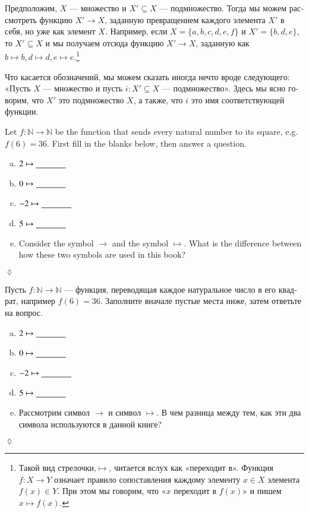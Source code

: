 \documentclass[a4paper]{book}
\def\NN{{\mathbb N}}
\def\to{\rightarrow}
\def\taking{\colon}
\def\ss{\subseteq}
\def\ul{\underline}
\theoremstyle{myth}
\newtheorem{excENG}[envENG]{\begin{english}Exercise\end{english}}
\newenvironment{exerciseENG}{\begin{excENG}}{\hspace*{\fill}$\lozenge$\end{excENG}}
\newtheorem{exampleRUS}[envRUS]{\begin{russian}Пример\end{russian}}
\newtheorem{excRUS}[envRUS]{\begin{russian}Упражнение\end{russian}}
\newenvironment{exerciseRUS}{\begin{excRUS}}{\hspace*{\fill}$\lozenge$\end{excRUS}}
\def\sexc{\begin{enumerate}[a.)]\setlength{\itemsep}{.1cm}\setlength{\parskip}{.1cm}\item}
\def\next{\item}
\def\endsexc{\end{enumerate}}
\begin{document}
\begin{english}
\begin{exampleRUS}\label{ex:subset as function}
\begin{russian}
Предположим, $X$ — множество и $X'\ss X$ — подмножество. Тогда мы можем рассмотреть функцию $X'\to X$, заданную превращением каждого элемента $X'$ в себя, но уже как элемент $X$. Например, если $X=\{a,b,c,d,e,f\}$ и $X'=\{b,d,e\}$, то $X'\ss X$ и мы получаем отсюда функцию $X'\to X$, заданную как $b\mapsto b, d\mapsto d, e\mapsto e$.\footnote{Такой вид стрелочки,\;\;$\mapsto$\;\;, читается вслух как «переходит в». Функция $f\taking X\to Y$ означает правило сопоставления каждому элементу $x\in X$ элемента $f(x)\in Y$. При этом мы говорим, что «$x$ переходит в $f(x)$» и пишем $x\mapsto f(x)$.}

Что касается обозначений, мы можем сказать иногда нечто вроде следующего: «Пусть $X$ — множество и пусть $i\taking X'\ss X$ — подмножество». Здесь мы ясно говорим, что $X'$ это подмножество $X$, а также, что $i$ это имя соответствующей функции. 
\end{russian}
\end{exampleRUS}

\begin{exerciseENG}
Let $f\taking\NN\to\NN$ be the function that sends every natural number to its square, e.g. $f(6)=36$. First fill in the blanks below, then answer a question.
\sexc $2\mapsto\ul{\hspace{.5in}}$
\next $0\mapsto\ul{\hspace{.5in}}$
\next $-2\mapsto\ul{\hspace{.5in}}$
\next $5\mapsto\ul{\hspace{.5in}}$
\next Consider the symbol $\to$ and the symbol $\mapsto$. What is the difference between how these two symbols are used in this book?
\endsexc
\end{exerciseENG}

\begin{exerciseRUS}
\begin{russian}
Пусть $f\taking\NN\to\NN$ — функция, переводящая каждое натуральное число в его квадрат, например $f(6)=36$. Заполните вначале пустые места ниже, затем ответьте на вопрос.
\sexc $2\mapsto\ul{\hspace{.5in}}$
\next $0\mapsto\ul{\hspace{.5in}}$
\next $-2\mapsto\ul{\hspace{.5in}}$
\next $5\mapsto\ul{\hspace{.5in}}$
\next Рассмотрим символ $\to$ и символ $\mapsto$. В чем разница между тем, как эти два символа используются в данной книге?
\endsexc
\end{russian}
\end{exerciseRUS}


\end{english}
\end{document}
